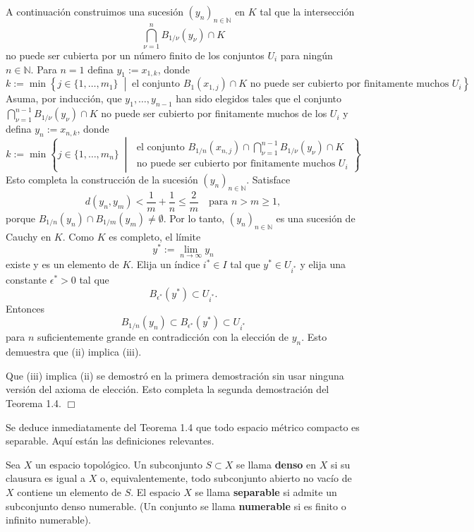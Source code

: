 A continuación construimos una sucesión $(y_{n})_{n\in\mathbb{N}}$ en $K$ tal que la intersección
\[ \bigcap_{\nu=1}^{n}B_{1/\nu}(y_{\nu})\cap K \]
no puede ser cubierta por un número finito de los conjuntos $U_{i}$ para ningún $n\in\mathbb{N}$. Para $n=1$ defina $y_{1}:=x_{1,k}$, donde
\[ k := \min\left\{j\in\{1,\dots,m_{1}\} \;\middle|\; \text{el conjunto } B_{1}(x_{1,j})\cap K \text{ no puede ser cubierto por finitamente muchos } U_{i} \right\} \]
Asuma, por inducción, que $y_{1},\dots,y_{n-1}$ han sido elegidos tales que el conjunto $\bigcap_{\nu=1}^{n-1}B_{1/\nu}(y_{\nu})\cap K$ no puede ser cubierto por finitamente muchos de los $U_{i}$ y defina $y_{n}:=x_{n,k}$, donde
\[ k := \min\left\{j\in\{1,\dots,m_{n}\} \;\middle|\; \begin{array}{l} \text{el conjunto } B_{1/n}(x_{n,j})\cap\bigcap_{\nu=1}^{n-1}B_{1/\nu}(y_{\nu})\cap K \\ \text{no puede ser cubierto por finitamente muchos } U_{i} \end{array} \right\} \]
Esto completa la construcción de la sucesión $(y_{n})_{n\in\mathbb{N}}$. Satisface
\[ d(y_{n},y_{m})<\frac{1}{m}+\frac{1}{n}\le\frac{2}{m} \quad \text{para } n>m\ge 1, \]
porque $B_{1/n}(y_{n})\cap B_{1/m}(y_{m})\ne\emptyset$. Por lo tanto, $(y_{n})_{n\in\mathbb{N}}$ es una sucesión de Cauchy en $K$. Como $K$ es completo, el límite
\[ y^{*} := \lim_{n\rightarrow\infty}y_{n} \]
existe y es un elemento de $K$. Elija un índice $i^{*}\in I$ tal que $y^{*}\in U_{i^{*}}$ y elija una constante $\epsilon^{*}>0$ tal que
\[ B_{\epsilon^{*}}(y^{*})\subset U_{i^{*}}. \]
Entonces
\[ B_{1/n}(y_{n})\subset B_{\epsilon^{*}}(y^{*})\subset U_{i^{*}} \]
para $n$ suficientemente grande en contradicción con la elección de $y_{n}$. Esto demuestra que (ii) implica (iii).

Que (iii) implica (ii) se demostró en la primera demostración sin usar ninguna versión del axioma de elección. Esto completa la segunda demostración del Teorema 1.4. \hfill $\Box$

Se deduce inmediatamente del Teorema 1.4 que todo espacio métrico compacto es separable. Aquí están las definiciones relevantes.

\begin{definition}\label{def:1.6}
Sea $X$ un espacio topológico. Un subconjunto $S\subset X$ se llama \textbf{denso} en $X$ si su clausura es igual a $X$ o, equivalentemente, todo subconjunto abierto no vacío de $X$ contiene un elemento de $S$. El espacio $X$ se llama \textbf{separable} si admite un subconjunto denso numerable. (Un conjunto se llama \textbf{numerable} si es finito o infinito numerable).
\end{definition}

